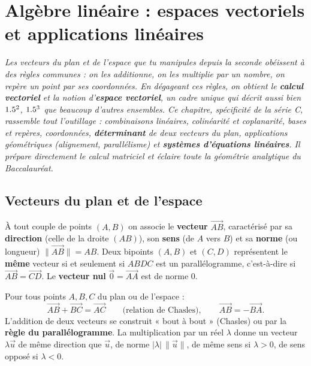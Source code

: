 \chapter{Algèbre linéaire : espaces vectoriels et applications linéaires}

\noindent\textit{Les vecteurs du plan et de l'espace que tu manipules depuis la seconde
obéissent à des règles communes : on les additionne, on les multiplie par un nombre, on
repère un point par ses coordonnées. En dégageant ces règles, on obtient le \textbf{calcul
vectoriel} et la notion d'\textbf{espace vectoriel}, un cadre unique qui décrit aussi bien
$1.5^2$, $1.5^3$ que beaucoup d'autres ensembles. Ce chapitre, spécificité de la série C,
rassemble tout l'outillage : combinaisons linéaires, colinéarité et coplanarité, bases et
repères, coordonnées, \textbf{déterminant} de deux vecteurs du plan, applications
géométriques (alignement, parallélisme) et \textbf{systèmes d'équations linéaires}. Il prépare
directement le calcul matriciel et éclaire toute la géométrie analytique du Baccalauréat.}
\vspace{8pt}

\section{Vecteurs du plan et de l'espace}

\begin{definition}[Vecteur]
À tout couple de points $(A,B)$ on associe le \textbf{vecteur} $\vec{AB}$, caractérisé par
sa \textbf{direction} (celle de la droite $(AB)$), son \textbf{sens} (de $A$ vers $B$) et sa
\textbf{norme} (ou longueur) $\|\vec{AB}\|=AB$. Deux bipoints $(A,B)$ et $(C,D)$ représentent
le \textbf{même} vecteur si et seulement si $ABDC$ est un parallélogramme, c'est-à-dire si
$\vec{AB}=\vec{CD}$. Le \textbf{vecteur nul} $\vec 0=\vec{AA}$ est de norme $0$.
\end{definition}

\begin{propriete}
Pour tous points $A,B,C$ du plan ou de l'espace :
\[
\vec{AB}+\vec{BC}=\vec{AC}\qquad\text{(relation de Chasles)},\qquad \vec{AB}=-\vec{BA}.
\]
L'addition de deux vecteurs se construit « bout à bout » (Chasles) ou par la
\textbf{règle du parallélogramme}. La multiplication par un réel $\lambda$ donne un vecteur
$\lambda\vec u$ de même direction que $\vec u$, de norme $|\lambda|\,\|\vec u\|$, de même sens
si $\lambda>0$, de sens opposé si $\lambda<0$.
\end{propriete}

